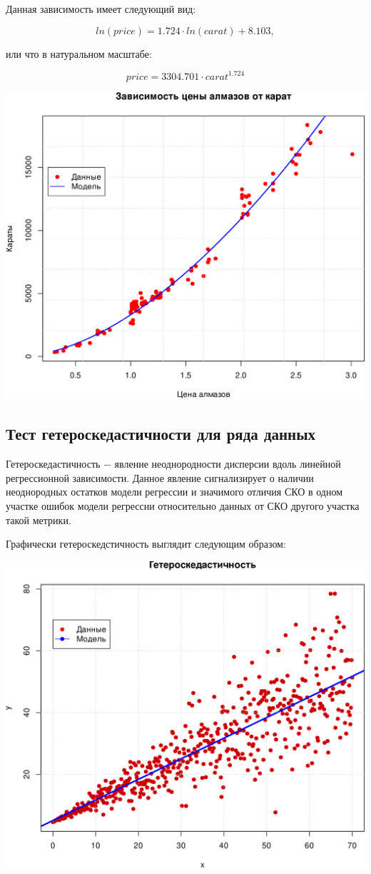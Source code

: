\documentclass[
]{article}
\begin{document}
Данная зависимость имеет следующий вид:

\[
ln(price) = 1.724 \cdot ln(carat) + 8.103,
\]

или что в натуральном масштабе:

\[
price = 3304.701 \cdot carat^{1.724}
\]

\begin{center}\includegraphics[width=0.6\linewidth]{Prac5_files/figure-latex/unnamed-chunk-15-1} \end{center}

\hypertarget{ux442ux435ux441ux442-ux433ux435ux442ux435ux440ux43eux441ux43aux435ux434ux430ux441ux442ux438ux447ux43dux43eux441ux442ux438-ux434ux43bux44f-ux440ux44fux434ux430-ux434ux430ux43dux43dux44bux445}{%
\subsection{\texorpdfstring{\textbf{Тест гетероскедастичности для ряда
данных}}{Тест гетероскедастичности для ряда данных}}\label{ux442ux435ux441ux442-ux433ux435ux442ux435ux440ux43eux441ux43aux435ux434ux430ux441ux442ux438ux447ux43dux43eux441ux442ux438-ux434ux43bux44f-ux440ux44fux434ux430-ux434ux430ux43dux43dux44bux445}}

Гетероскедастичность \(-\) явление неоднородности дисперсии вдоль
линейной регрессионной зависимости. Данное явление сигнализирует о
наличии неоднородных остатков модели регрессии и значимого отличия СКО в
одном участке ошибок модели регрессии относительно данных от СКО другого
участка такой метрики.

Графически гетероскедстичность выглядит следующим образом:

\begin{center}\includegraphics[width=0.6\linewidth]{Prac5_files/figure-latex/unnamed-chunk-16-1} \end{center}
\end{document}
